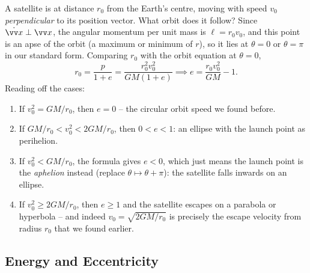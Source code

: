 \begin{center}
\end{center}

\begin{example}
	A satellite is at distance $r_0$ from the Earth's centre, moving with speed $v_0$ \emph{perpendicular} to its position vector. What orbit does it follow? Since $\dot{\vv x} \perp \vv x$, the angular momentum per unit mass is $\ell = r_0 v_0$, and this point is an apse of the orbit (a maximum or minimum of $r$), so it lies at $\theta = 0$ or $\theta = \pi$ in our standard form. Comparing $r_0$ with the orbit equation at $\theta = 0$,
	$$
	r_0 = \frac{p}{1 + e} = \frac{r_0^2 v_0^2}{GM(1 + e)} \implies e = \frac{r_0 v_0^2}{GM} - 1.
	$$
	Reading off the cases:
	\begin{enumerate}[label=(\roman*)]
		\item If $v_0^2 = GM/r_0$, then $e = 0$ -- the circular orbit speed we found before.
		\item If $GM/r_0 < v_0^2 < 2GM/r_0$, then $0 < e < 1$: an ellipse with the launch point as perihelion.
		\item If $v_0^2 < GM/r_0$, the formula gives $e < 0$, which just means the launch point is the \emph{aphelion} instead (replace $\theta \mapsto \theta + \pi$): the satellite falls inwards on an ellipse.
		\item If $v_0^2 \geq 2GM/r_0$, then $e \geq 1$ and the satellite escapes on a parabola or hyperbola -- and indeed $v_0 = \sqrt{2GM/r_0}$ is precisely the escape velocity from radius $r_0$ that we found earlier.
	\end{enumerate}
\end{example}

\subsection{Energy and Eccentricity}


